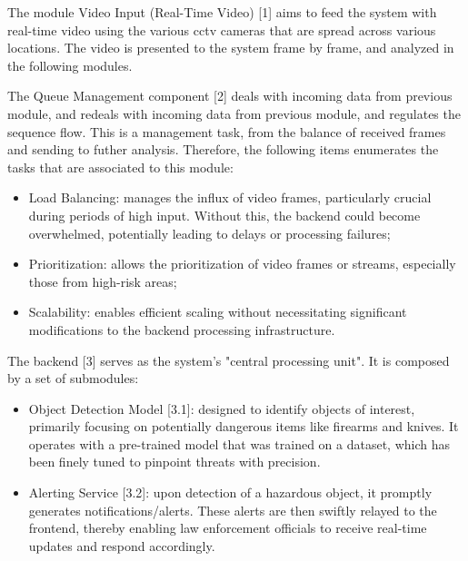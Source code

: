 The module Video Input (Real-Time Video) [1] aims to feed the system with real-time video using the various \ac{cctv} 
cameras that are spread across various locations.  The video is presented to the system frame by frame, and analyzed 
in the following modules.

The Queue Management component [2] deals with incoming data from previous module, and redeals with incoming data 
from previous module, and regulates the sequence flow. This is a management task, from the balance of received frames 
and sending to futher analysis. Therefore, the following items enumerates the tasks that are associated to this module:

\begin{itemize}
    \item Load Balancing: manages the influx of video frames, particularly crucial during periods of high input. Without this, the backend could become overwhelmed, potentially leading to delays or processing failures;
    \item Prioritization: allows the prioritization of video frames or streams, especially those from high-risk areas;
    \item Scalability: enables efficient scaling without necessitating significant modifications to the backend processing infrastructure.
\end{itemize}

The backend [3] serves as the system's "central processing unit". It is composed by a set of submodules:
\begin{itemize}
    \item Object Detection Model [3.1]: designed to identify objects of interest, primarily focusing on potentially dangerous items like firearms and knives. It operates with a pre-trained model that was trained on a dataset, which has been finely tuned to pinpoint threats with precision.
    \item Alerting Service [3.2]: upon detection of a hazardous object, it promptly generates notifications/alerts. These alerts are then swiftly relayed to the frontend, thereby enabling law enforcement officials to receive real-time updates and respond accordingly.
\end{itemize}


